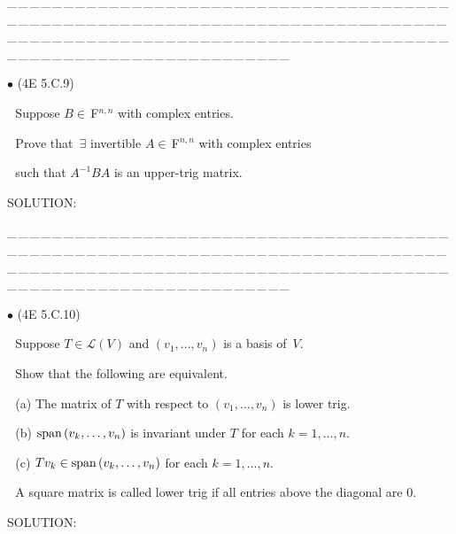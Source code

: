 \documentclass[a4paper, 11pt, UTF8]{article}
\def\Spn{\textup{span}\,}
\def\Lm{\mathcal{L}}
\def\Fbfc{$\,{\timesbf F}$}
\begin{document}
\begin{large}
\par
{\tiny \_\,\_\,\_\,\_\,\_\,\_\,\_\,\_\,\_\,\_\,\_\,\_\,\_\,\_\,\_\,\_\,\_\,\_\,\_\,\_\,\_\,\_\,\_\,\_\,\_\,\_\,\_\,\_\,\_\,\_\,\_\,\_\,\_\,\_\,\_\,\_\,\_\,\_\,\_\,\_\,\_\,\_\,\_\,\_\,\_\,\_\,\_\,\_\,\_\,\_\,\_\,\_\,\_\,\_\,\_\,\_\,\_\,\_\,\_\,\_\,\_\,\_\,\_\,\_\,\_\,\_\,\_\,\_\,\_\,\_\,\_\_\,\_\,\_\,\_\,\_\,\_\,\_\,\_\,\_\,\_\,\_\,\_\,\_\,\_\,\_\,\_\,\_\,\_\,\_\,\_\,\_\,\_\,\_\,\_\,\_\,\_\,\_\,\_\,\_\,\_\,\_\,\_\,\_\,\_\,\_\,\_\,\_\,\_\,\_\,\_\,\_\,\_\,\_\,\_\,\_\,\_\,\_\,\_\,\_\,\_\,\_\,\_\,\_\,\_\,\_\,\_\,\_\,\_\,\_\,\_\,\_\,\_\,\_\,\_\,\_\,\_\,\_\,\_\,\_\,\_\,\_}\par

{\small $\bullet$} (\normalsize{4E 5.C.9})\par\,\, {\timessl\Large 
Suppose $B\in\Fbfc^{n,n}$ with complex entries.}\par\,\,
{\timessl\Large Prove that $\,\exists$ invertible $A\in\Fbfc^{n,n}$ with complex entries}\par\,\,
{\timessl\Large such that $A^{-1} BA$ is an upper-trig matrix.
}\par
{\timesbf S\footnotesize{OLUTION:}}\par\quad

\par
{\tiny \_\,\_\,\_\,\_\,\_\,\_\,\_\,\_\,\_\,\_\,\_\,\_\,\_\,\_\,\_\,\_\,\_\,\_\,\_\,\_\,\_\,\_\,\_\,\_\,\_\,\_\,\_\,\_\,\_\,\_\,\_\,\_\,\_\,\_\,\_\,\_\,\_\,\_\,\_\,\_\,\_\,\_\,\_\,\_\,\_\,\_\,\_\,\_\,\_\,\_\,\_\,\_\,\_\,\_\,\_\,\_\,\_\,\_\,\_\,\_\,\_\,\_\,\_\,\_\,\_\,\_\,\_\,\_\,\_\,\_\,\_\_\,\_\,\_\,\_\,\_\,\_\,\_\,\_\,\_\,\_\,\_\,\_\,\_\,\_\,\_\,\_\,\_\,\_\,\_\,\_\,\_\,\_\,\_\,\_\,\_\,\_\,\_\,\_\,\_\,\_\,\_\,\_\,\_\,\_\,\_\,\_\,\_\,\_\,\_\,\_\,\_\,\_\,\_\,\_\,\_\,\_\,\_\,\_\,\_\,\_\,\_\,\_\,\_\,\_\,\_\,\_\,\_\,\_\,\_\,\_\,\_\,\_\,\_\,\_\,\_\,\_\,\_\,\_\,\_\,\_\,\_}\par

{\small $\bullet$} (\normalsize{4E 5.C.10})\par\,\,
 {\timessl\Large 
Suppose $T\in \Lm(V)$ and $(v_1 , \dots , v_n)$ is a basis of \,$V$.}\par\,\,
{\timessl\Large Show that the following are equivalent.
}\par\,\,
(a) {\timessl\Large
The matrix of $T$ with respect to $(v_1 , \dots , v_n)$ is lower trig.
}\par\,\,
(b) {\timessl\Large
$\Spn(v_k , \dots , v_n )$ is invariant under $T$ for each $k = 1, \dots , n$.
}\par\,\,
(c) {\timessl\Large
$Tv_k \in \Spn(v_k , \dots , v_n )$ for each $k = 1, \dots , n$.
}\par\,\,
{\timessl\small
A square matrix is called lower trig if all entries above the diagonal are $0$.}\par
{\timesbf S\footnotesize{OLUTION:}}\par\quad


\end{large}
\end{document}
